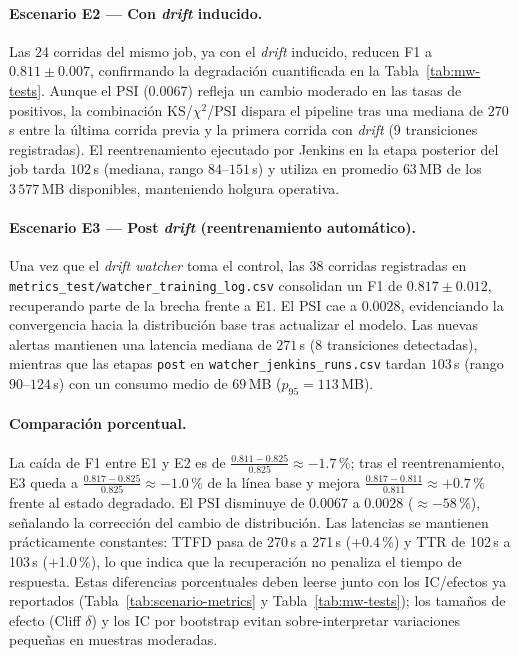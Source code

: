 \paragraph{Escenario E2 — Con \textit{drift} inducido.}
Las 24 corridas del mismo job, ya con el \textit{drift} inducido, reducen F1 a $0.811\pm0.007$, confirmando la degradación cuantificada en la Tabla~\ref{tab:mw-tests}. Aunque el PSI (0.0067) refleja un cambio moderado en las tasas de positivos, la combinación KS/$\chi^2$/PSI dispara el pipeline tras una mediana de $270$\,s entre la última corrida previa y la primera corrida con \textit{drift} (9 transiciones registradas). El reentrenamiento ejecutado por Jenkins en la etapa posterior del job tarda $102$\,s (mediana, rango $84$--$151$\,s) y utiliza en promedio $63$\,MB de los $3\,577$\,MB disponibles, manteniendo holgura operativa.

\paragraph{Escenario E3 — Post \textit{drift} (reentrenamiento automático).}
Una vez que el \textit{drift watcher} toma el control, las 38 corridas registradas en \texttt{metrics\_test/watcher\_training\_log.csv} consolidan un F1 de $0.817\pm0.012$, recuperando parte de la brecha frente a E1. El PSI cae a $0.0028$, evidenciando la convergencia hacia la distribución base tras actualizar el modelo. Las nuevas alertas mantienen una latencia mediana de $271$\,s (8 transiciones detectadas), mientras que las etapas \texttt{post} en \texttt{watcher\_jenkins\_runs.csv} tardan $103$\,s (rango $90$--$124$\,s) con un consumo medio de $69$\,MB ($p_{95}=113$\,MB).

\paragraph{Comparación porcentual.}
La caída de F1 entre E1 y E2 es de \(\frac{0.811-0.825}{0.825}\approx -1.7\,\%\); tras el reentrenamiento, E3 queda a \(\frac{0.817-0.825}{0.825}\approx -1.0\,\%\) de la línea base y mejora \(\frac{0.817-0.811}{0.811}\approx +0.7\,\%\) frente al estado degradado. El PSI disminuye de $0.0067$ a $0.0028$ (\(\approx -58\,\%\)), señalando la corrección del cambio de distribución. Las latencias se mantienen prácticamente constantes: TTFD pasa de 270\,s a 271\,s (+0.4\,\%) y TTR de 102\,s a 103\,s (+1.0\,\%), lo que indica que la recuperación no penaliza el tiempo de respuesta.
Estas diferencias porcentuales deben leerse junto con los IC/efectos ya reportados (Tabla~\ref{tab:scenario-metrics} y Tabla~\ref{tab:mw-tests}); los tamaños de efecto (Cliff $\delta$) y los IC por bootstrap evitan sobre-interpretar variaciones pequeñas en muestras moderadas.

